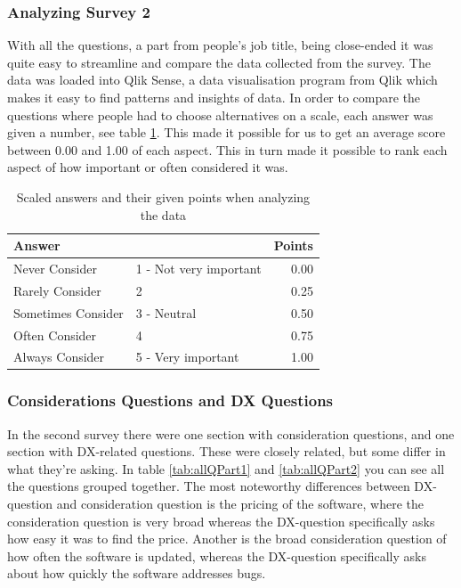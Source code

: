 \documentclass{cslthse-msc}
\begin{document}
    \subsubsection{Analyzing Survey 2}
    With all the questions, a part from people's job title, being close-ended it was quite easy to streamline and compare the data collected from the survey. The data was loaded into Qlik Sense, a data visualisation program from Qlik which makes it easy to find patterns and insights of data. In order to compare the questions where people had to choose alternatives on a scale, each answer was given a number, see table \ref{tabl:points}.
    This made it possible for us to get an average score between 0.00 and 1.00 of each aspect. This in turn made it possible to rank each aspect of how important or often considered it was.
    \begin{table}[H]
        \caption{Scaled answers and their given points when analyzing the data}
        \label{tabl:points}
        \centering
        \begin{tabular}{l l|r}
            \multicolumn{2}{l}{\textbf{Answer}} & \textbf{Points} \\ \hline
            Never Consider & 1 - Not very important & 0.00  \\ \hline
            Rarely Consider & 2 & 0.25 \\ \hline
            Sometimes Consider & 3 - Neutral & 0.50 \\ \hline
            Often Consider & 4 & 0.75 \\ \hline
            Always Consider & 5 - Very important & 1.00 \\ \hline
        \end{tabular}
    \end{table}

    \subsubsection{Considerations Questions and DX Questions}\label{consisQuestions}
    In the second survey there were one section with consideration questions, and one section with DX-related questions. These were closely related, but some differ in what they're asking. In table \ref{tab:allQPart1} and \ref{tab:allQPart2} you can see all the questions grouped together. The most noteworthy differences between DX-question and consideration question is the pricing of the software, where the consideration question is very broad whereas the DX-question specifically asks how easy it was to find the price. Another is the broad consideration question of how often the software is updated, whereas the DX-question specifically asks about how quickly the software addresses bugs.
\end{document}
